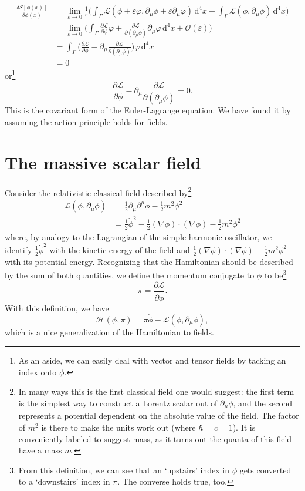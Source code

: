 \documentclass{article}
\begin{document}
	\begin{align*}
		\frac{\delta S[\phi(x)]}{\delta \phi(x)} &= \lim_{\varepsilon\to0}\frac{1}{\varepsilon}\Big(\int_\Gamma\mathcal{L}(\phi + \varepsilon\varphi, \partial_\mu\phi + \varepsilon\partial_\mu\varphi)\,\mathrm{d}^4x - \int_{\Gamma}\mathcal{L}(\phi, \partial_\mu\phi)\,\mathrm{d}^4x\Big) \\
		&= \lim_{\varepsilon\to0}\Big(\int_{\Gamma}\frac{\partial\mathcal{L}}{\partial\phi}\varphi + \frac{\partial\mathcal{L}}{\partial(\partial_\mu\phi)}\partial_\mu\varphi\,\mathrm{d}^4x + \mathcal{O}(\varepsilon)\Big) \\
		&= \int_{\Gamma}\Big(\frac{\partial\mathcal{L}}{\partial\phi} - \partial_\mu\frac{\partial\mathcal{L}}{\partial(\partial_\mu\phi)}\Big)\varphi\,\mathrm{d}^4x \\
		&= 0
	\end{align*}
	or\footnote{As an aside, we can easily deal with vector and tensor fields by tacking an index onto $\phi$.}
	\[
		\frac{\partial\mathcal{L}}{\partial\phi} - \partial_\mu\frac{\partial\mathcal{L}}{\partial(\partial_\mu\phi)} = 0.
	\]
	This is the covariant form of the Euler-Lagrange equation. We have found it by assuming the action principle holds for fields.
	
	\section{The massive scalar field}
	
	Consider the relativistic classical field described by\footnote{In many ways this is the first classical field one would suggest: the first term is the simplest way to construct a Lorentz scalar out of $\partial_\mu\phi$, and the second represents a potential dependent on the absolute value of the field. The factor of $m^2$ is there to make the units work out (where $\hbar=c=1$). It is conveniently labeled to suggest mass, as it turns out the quanta of this field have a mass $m$.}
	\begin{align*}
	\mathcal{L}(\phi, \partial_\mu\phi) &= \frac{1}{2}\partial_\mu\partial^\mu\phi - \frac{1}{2}m^2\phi^2 \\&
	= \frac{1}{2}\dot{\phi}^2 - \frac{1}{2}(\nabla\phi)\cdot(\nabla\phi)-\frac{1}{2}m^2\phi^2
	\end{align*}
	where, by analogy to the Lagrangian of the simple harmonic oscillator, we identify $\frac{1}{2}\dot\phi^2$ with the kinetic energy of the field and $\frac{1}{2}(\nabla\phi)\cdot(\nabla\phi)+\frac{1}{2}m^2\phi^2$  with its potential energy. Recognizing that the Hamiltonian should be described by the sum of both quantities, we define the momentum conjugate to $\phi$ to be\footnote{From this definition, we can see that an `upstairs' index in $\phi$ gets converted to a `downstairs' index in $\pi$. The converse holds true, too.}
	\[
		\pi = \frac{\partial\mathcal{L}}{\partial\dot{\phi}}.
	\]
	With this definition, we have
	\[
		\mathcal{H}(\phi, \pi) = \pi\dot\phi - \mathcal{L}(\phi, \partial_\mu\phi),
	\]
	which is a nice generalization of the Hamiltonian to fields.
	
\end{document}
